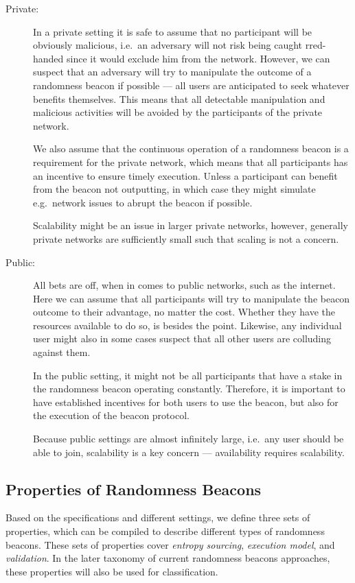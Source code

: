 \begin{description}
    \item[Private:]
        In a private setting it is safe to assume that no participant will be obviously malicious, i.e.\ an adversary will not risk being caught rred-handed since it would exclude him from the network.
        However, we can suspect that an adversary will try to manipulate the outcome of a randomness beacon if possible --- all users are anticipated to seek whatever benefits themselves.
        This means that all detectable manipulation and malicious activities will be avoided by the participants of the private network.

        We also assume that the continuous operation of a randomness beacon is a requirement for the private network, which means that all participants has an incentive to ensure timely execution.
        Unless a participant can benefit from the beacon not outputting, in which case they might simulate e.g.\ network issues to abrupt the beacon if possible.

        Scalability might be an issue in larger private networks, however, generally private networks are sufficiently small such that scaling is not a concern.
    \item[Public:]
        All bets are off, when in comes to public networks, such as the internet.
        Here we can assume that all participants will try to manipulate the beacon outcome to their advantage, no matter the cost.
        Whether they have the resources available to do so, is besides the point.
        Likewise, any individual user might also in some cases suspect that all other users are colluding against them.

        In the public setting, it might not be all participants that have a stake in the randomness beacon operating constantly.
        Therefore, it is important to have established incentives for both users to use the beacon, but also for the execution of the beacon protocol.

        Because public settings are almost infinitely large, i.e.\ any user should be able to join, scalability is a key concern --- availability requires scalability.
\end{description}

\subsection{Properties of Randomness Beacons}
Based on the specifications and different settings, we define three sets of properties, which can be compiled to describe different types of randomness beacons.
These sets of properties cover \emph{entropy sourcing}, \emph{execution model}, and \emph{validation}.
In the later taxonomy of current randomness beacons approaches, these properties will also be used for classification.

